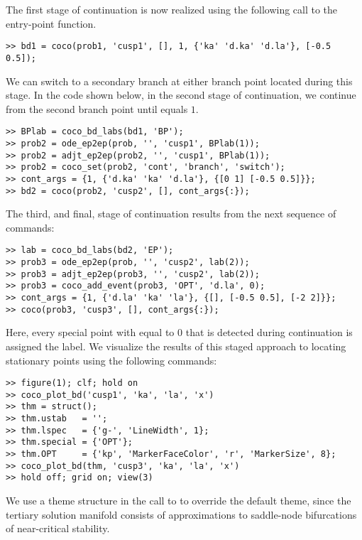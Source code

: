 The first stage of continuation is now realized using the following call to the  entry-point function.
\begin{lstlisting}[language=coco-highlight]
>> bd1 = coco(prob1, 'cusp1', [], 1, {'ka' 'd.ka' 'd.la'}, [-0.5 0.5]);
\end{lstlisting}
We can switch to a secondary branch at either branch point located during this stage. In the code shown below, in the second stage of continuation, we continue from the second branch point until  equals $1$.
\begin{lstlisting}[language=coco-highlight]
>> BPlab = coco_bd_labs(bd1, 'BP');
>> prob2 = ode_ep2ep(prob, '', 'cusp1', BPlab(1));
>> prob2 = adjt_ep2ep(prob2, '', 'cusp1', BPlab(1));
>> prob2 = coco_set(prob2, 'cont', 'branch', 'switch');
>> cont_args = {1, {'d.ka' 'ka' 'd.la'}, {[0 1] [-0.5 0.5]}};
>> bd2 = coco(prob2, 'cusp2', [], cont_args{:});
\end{lstlisting}
The third, and final, stage of continuation results from the next sequence of commands:
\begin{lstlisting}[language=coco-highlight]
>> lab = coco_bd_labs(bd2, 'EP');
>> prob3 = ode_ep2ep(prob, '', 'cusp2', lab(2));
>> prob3 = adjt_ep2ep(prob3, '', 'cusp2', lab(2));
>> prob3 = coco_add_event(prob3, 'OPT', 'd.la', 0);
>> cont_args = {1, {'d.la' 'ka' 'la'}, {[], [-0.5 0.5], [-2 2]}};
>> coco(prob3, 'cusp3', [], cont_args{:});
\end{lstlisting}
Here, every special point with  equal to $0$ that is detected during continuation is assigned the  label. We visualize the results of this staged approach to locating stationary points using the following commands:
\begin{lstlisting}[language=coco-highlight]
>> figure(1); clf; hold on
>> coco_plot_bd('cusp1', 'ka', 'la', 'x')
>> thm = struct();
>> thm.ustab   = '';
>> thm.lspec   = {'g-', 'LineWidth', 1};
>> thm.special = {'OPT'};
>> thm.OPT     = {'kp', 'MarkerFaceColor', 'r', 'MarkerSize', 8};
>> coco_plot_bd(thm, 'cusp3', 'ka', 'la', 'x')
>> hold off; grid on; view(3)
\end{lstlisting}
We use a theme structure in the call to  to override the default  theme, since the tertiary solution manifold consists of approximations to saddle-node bifurcations of near-critical stability.\\
\medskip

